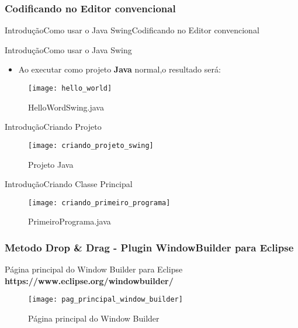 \documentclass[10pt]{beamer}
\begin{document}
\subsubsection{Codificando no Editor convencional}
\begin{frame}[allowframebreaks]{Introdução}{Como usar o Java Swing}{Codificando no Editor convencional}

\end{frame}{}

\begin{frame}{Introdução}{Como usar o Java Swing}
\begin{itemize}
\item Ao executar como projeto \textbf{Java} normal,o resultado será:
\end{itemize}
  \begin{figure}[!htb]
    \centering
    \texttt{[image: hello\_world]}
    \caption{HelloWordSwing.java}
    \label{figRotulo}
  \end{figure}
\end{frame}{}


\begin{frame}{Introdução}{Criando Projeto}
  \begin{figure}[!htb]
    \centering
    \texttt{[image: criando\_projeto\_swing]}
    \caption{Projeto Java}
    \label{figRotulo}
  \end{figure}
\end{frame}{}

\begin{frame}{Introdução}{Criando Classe Principal}
  \begin{figure}[!htb]
    \centering
    \texttt{[image: criando\_primeiro\_programa]}
    \caption{PrimeiroPrograma.java}
    \label{figRotulo}
  \end{figure}
\end{frame}{}

\subsubsection{Metodo Drop \& Drag - Plugin WindowBuilder para Eclipse}
\begin{frame}{Página principal do Window Builder para Eclipse}
\textbf{https://www.eclipse.org/windowbuilder/}
  \begin{figure}[!htb]
    \centering
    \texttt{[image: pag\_principal\_window\_builder]}
    \caption{Página principal do Window Builder}
    \label{figRotulo}
  \end{figure}
\end{frame}{}
\end{document}
